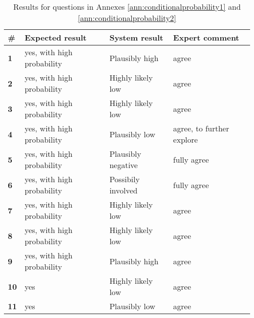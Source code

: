 \begin{table}[h]
	\centering
	\caption{Results for questions in Annexes  \ref{ann:conditionalprobability1} and \ref{ann:conditionalprobability2}}
	\begin{tabularx}{\textwidth}{lllX}
		\toprule
		\textbf{\#} & Expected result & System result & Expert comment  \\
		\midrule	
		 \textbf{1} & yes, with high probability & Plausibly high & agree \\
		 \textbf{2} & yes, with high probability & Highly likely low & agree \\
		 \multirow{2}[0]{*}{\textbf{3}} & \multirow{2}[0]{*}{yes, with high probability} & \multirow{2}[0]{*}{Highly likely low} & \multirow{2}[0]{*}{agree} \\
		      &       &       &  \\
		 \textbf{4} & yes, with high probability & Plausibly low & agree, to further explore \\
		 \addlinespace
		 \textbf{5} & yes, with high probability & Plausibly negative & fully agree \\
		 \textbf{6} & yes, with high probability & Possibily involved & fully agree \\
		 \multirow{2}[0]{*}{\textbf{7}} & \multirow{2}[0]{*}{yes, with high probability} & \multirow{2}[0]{*}{Highly likely low} & \multirow{2}[0]{*}{agree} \\
		      &       &       &  \\
		 \textbf{8} & yes, with high probability & Highly likely low & agree \\
		 \multirow{2}[0]{*}{\textbf{9}} & \multirow{2}[0]{*}{yes, with high probability} & \multirow{2}[0]{*}{Plausibly high} & \multirow{2}[0]{*}{agree} \\
		      &       &       &  \\
		 \multirow{2}[0]{*}{\textbf{10}} & \multirow{2}[0]{*}{yes} & \multirow{2}[0]{*}{Highly likely low} & \multirow{2}[0]{*}{agree} \\
	      &       &       &  \\
		\multirow{3}[0]{*}{\textbf{11}} & \multirow{3}[0]{*}{yes} & \multirow{3}[0]{*}{Plausibly low} & \multirow{3}[0]{*}{agree} \\
		      &       &       &  \\
		      &       &       &  \\


\end{tabularx}
\end{table}
